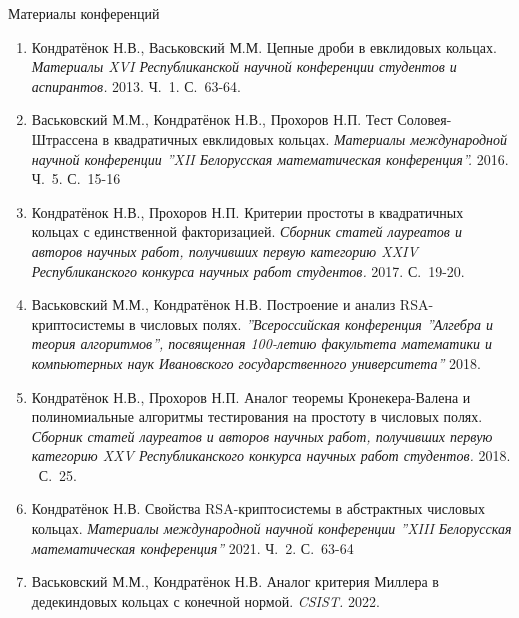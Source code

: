 \documentclass[8pt, xcolor=x11names]{beamer}
\begin{document}
\begin{frame}{Материалы конференций}
    \begin{small}
        \begin{enumerate}
            \item Кондратёнок Н.В., Васьковский М.М. Цепные дроби в евклидовых кольцах. {\it Материалы XVI Республиканской научной конференции студентов и аспирантов.} 2013. Ч.~1. С.~63-64.
            
            \item Васьковский М.М., Кондратёнок Н.В., Прохоров Н.П. Тест Соловея-Штрассена в квадратичных евклидовых кольцах. {\it Материалы международной научной конференции ''XII Белорусская математическая конференция''.} 2016. Ч.~5. С.~15-16
            
            \item Кондратёнок Н.В., Прохоров Н.П. Критерии простоты в квадратичных кольцах с единственной факторизацией. {\it Сборник статей лауреатов и авторов научных работ, получивших первую категорию XXIV Республиканского конкурса научных работ студентов.} 2017. С.~19-20.
            
            \item Васьковский М.М., Кондратёнок Н.В. Построение и анализ RSA-криптосистемы в числовых полях. {\it ''Всероссийская конференция ''Алгебра и теория алгоритмов'', посвященная 100-летию факультета математики и компьютерных наук Ивановского государственного университета''} 2018.
            
            \item Кондратёнок Н.В., Прохоров Н.П. Аналог теоремы Кронекера-Валена и полиномиальные алгоритмы тестирования на простоту в числовых полях. {\it Сборник статей лауреатов и авторов научных работ, получивших первую категорию XXV Республиканского конкурса научных работ студентов.} 2018. \textendash\ С.~25.
    
            \item Кондратёнок Н.В. Свойства RSA-криптосистемы в абстрактных числовых кольцах. {\it Материалы международной научной конференции ''XIII Белорусская математическая конференция''} 2021. Ч.~2. С.~63-64

            \item Васьковский М.М., Кондратёнок Н.В. Аналог критерия Миллера в дедекиндовых кольцах с конечной нормой. {\it CSIST.} 2022.
        \end{enumerate}
    \end{small}
\end{frame}
\end{document}
